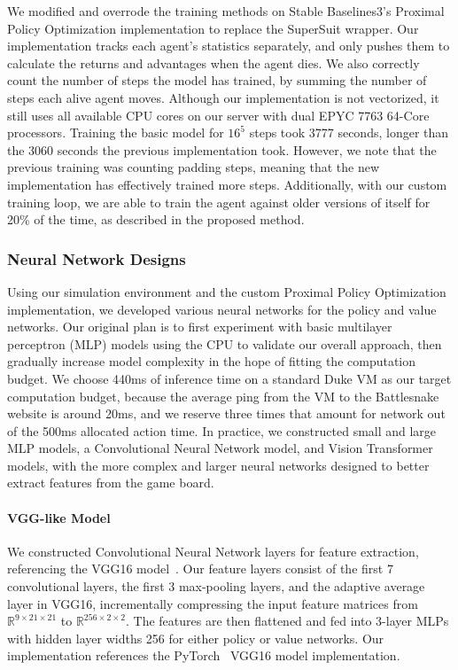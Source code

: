 \documentclass[conference]{IEEEtran}
\begin{document}
We modified and overrode the training methods on Stable Baselines3's Proximal
Policy Optimization implementation to replace the SuperSuit wrapper.
Our implementation tracks each agent's statistics separately,
and only pushes them to calculate the returns and advantages when the agent
dies. We also correctly count the number of steps the model has trained,
by summing the number of steps each alive agent moves.
Although our implementation is not vectorized,
it still uses all available CPU cores on our server with dual EPYC 7763 64-Core
processors. Training the basic model for $16^5$ steps took 3777 seconds,
longer than the 3060 seconds the previous implementation took. However,
we note that the previous training was counting padding steps,
meaning that the new implementation has effectively trained more steps.
Additionally, with our custom training loop,
we are able to train the agent against older versions of itself for 20\% of the
time, as described in the proposed method.

\subsubsection{Neural Network Designs}\label{sec:net-design}

Using our simulation environment and the custom Proximal Policy Optimization implementation,
we developed various neural networks for the policy and value networks.
Our original plan is to first experiment with basic multilayer perceptron (MLP)
models using the CPU to validate our overall approach,
then gradually increase model complexity in the hope of fitting the computation
budget.
We choose 440ms of inference time on a standard Duke VM as our target computation budget, because the average ping from the VM to the
Battlesnake website is around 20ms,
and we reserve three times that amount for network out of the 500ms allocated
action time.
In practice, we constructed small and large MLP models, a Convolutional Neural
Network model, and Vision Transformer models,
with the more complex and larger neural networks designed to better extract
features from the game board.

\paragraph{VGG-like Model}
We constructed Convolutional Neural Network layers for feature extraction,
referencing the VGG16 model~\cite{simonyan2014very}.
Our feature layers consist of the first 7 convolutional layers,
the first 3 max-pooling layers, and the adaptive average layer in VGG16,
incrementally compressing the input feature matrices from $\mathbb R^{9\times
            21\times 21}$ to $\mathbb R^{256\times 2\times 2}$.
The features are then flattened and fed into 3-layer MLPs with hidden layer
widths 256 for either policy or value networks.
Our implementation references the PyTorch~\cite{paszke2019pytorch}
VGG16 model implementation.
\end{document}
